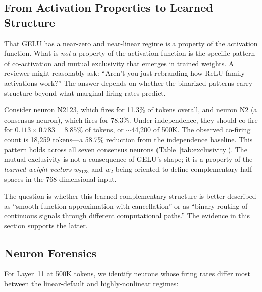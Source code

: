 \documentclass{article}
\begin{document}
\subsection{From Activation Properties to Learned Structure}

That GELU has a near-zero and near-linear regime is a property of the activation function.
What is \emph{not} a property of the activation function is the specific pattern of
co-activation and mutual exclusivity that emerges in trained weights. A reviewer might
reasonably ask: ``Aren't you just rebranding how ReLU-family activations work?'' The
answer depends on whether the binarized patterns carry structure beyond what marginal
firing rates predict.

Consider neuron N2123, which fires for 11.3\% of tokens overall, and neuron N2 (a consensus
neuron), which fires for 78.3\%. Under independence, they should co-fire for
$0.113 \times 0.783 = 8.85\%$ of tokens, or $\sim$44{,}200 of 500K. The observed co-firing
count is 18{,}259 tokens---a 58.7\% reduction from the independence baseline. This pattern holds
across all seven consensus neurons (Table~\ref{tab:exclusivity}). The mutual exclusivity is
not a consequence of GELU's shape; it is a property of the \emph{learned weight vectors}
$w_{2123}$ and $w_2$ being oriented to define complementary half-spaces in the
768-dimensional input.

The question is whether this learned complementary structure is better described as
``smooth function approximation with cancellation'' or as ``binary routing of continuous
signals through different computational paths.'' The evidence in this section supports
the latter.

\subsection{Neuron Forensics}

For Layer~11 at 500K tokens, we identify neurons whose firing rates differ most between
the linear-default and highly-nonlinear regimes:
\end{document}
